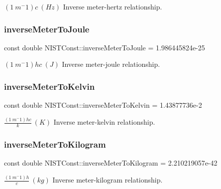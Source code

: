 $(1\ m^-1)c \ (Hz)$ Inverse meter-\/hertz relationship. \mbox{\label{group___n_i_s_t_const-_inverse_meter_gaa927232a822dccc33f7c56ac002aff52}} 
\subsubsection{\texorpdfstring{inverse\+Meter\+To\+Joule}{inverseMeterToJoule}}
{\footnotesize\ttfamily const double N\+I\+S\+T\+Const\+::inverse\+Meter\+To\+Joule = 1.\+986445824e-\/25}

$(1\ m^-1)hc \ (J)$ Inverse meter-\/joule relationship. \mbox{\label{group___n_i_s_t_const-_inverse_meter_gaf5a61f53f6757db329df597b76b2df69}} 
\subsubsection{\texorpdfstring{inverse\+Meter\+To\+Kelvin}{inverseMeterToKelvin}}
{\footnotesize\ttfamily const double N\+I\+S\+T\+Const\+::inverse\+Meter\+To\+Kelvin = 1.\+43877736e-\/2}

$\frac{(1\ m^-1)hc}{k} \ (K)$ Inverse meter-\/kelvin relationship. \mbox{\label{group___n_i_s_t_const-_inverse_meter_ga6b5807b2161fa29684e4862e575b9102}} 
\subsubsection{\texorpdfstring{inverse\+Meter\+To\+Kilogram}{inverseMeterToKilogram}}
{\footnotesize\ttfamily const double N\+I\+S\+T\+Const\+::inverse\+Meter\+To\+Kilogram = 2.\+210219057e-\/42}

$\frac{(1\ m^-1)h}{c} \ (kg)$ Inverse meter-\/kilogram relationship. 
